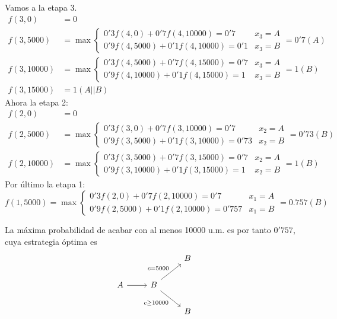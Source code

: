 \documentclass[twoside]{article}
\begin{document}
\begin{solucion}
\begin{enumerate}
Vamos a la etapa 3. 
\begin{align*}
f(3,0)&=0\\
f(3,5000)&=\max\begin{cases}
0'3f(4,0)+0'7f(4,10000)=0'7 & x_3=A\\
0'9f(4,5000)+0'1f(4,10000)=0'1 & x_3=B
\end{cases} = 0'7(A)\\
f(3,10000)&=\max\begin{cases}
0'3f(4,5000)+0'7f(4,15000)=0'7 & x_3=A\\
0'9f(4,10000)+0'1f(4,15000)=1 & x_3=B
\end{cases} = 1(B)\\
f(3,15000) &= 1(A||B)
\end{align*}
Ahora la etapa 2: 
\begin{align*}
f(2,0)&=0\\
f(2,5000)&=\max\begin{cases}
0'3f(3,0)+0'7f(3,10000)=0'7 & x_2=A\\
0'9f(3,5000)+0'1f(3,10000)=0'73 & x_2=B
\end{cases}=0'73(B)\\
f(2,10000)&=\max\begin{cases}
0'3f(3,5000)+0'7f(3,15000)=0'7 & x_2=A\\
0'9f(3,10000)+0'1f(3,15000)=1 & x_2=B
\end{cases} = 1(B)
\end{align*}
Por último la etapa 1:
$$f(1,5000)=\max\begin{cases}
0'3f(2,0)+0'7f(2,10000)=0'7 & x_1=A\\
0'9f(2,5000)+0'1f(2,10000)=0'757 & x_1=B
\end{cases} = 0.757(B)$$

La máxima probabilidad de acabar con al menos 10000 u.m. es por tanto $0'757$, cuya estrategia óptima es
\[
\begin{tikzcd}
&  & B\\
A\arrow[r] & B\arrow[ur,"c=5000"]\arrow[dr,"c\geq 10000"'] & \\
& & B
\end{tikzcd}
\]
\end{enumerate}
\end{solucion}
\end{document}

